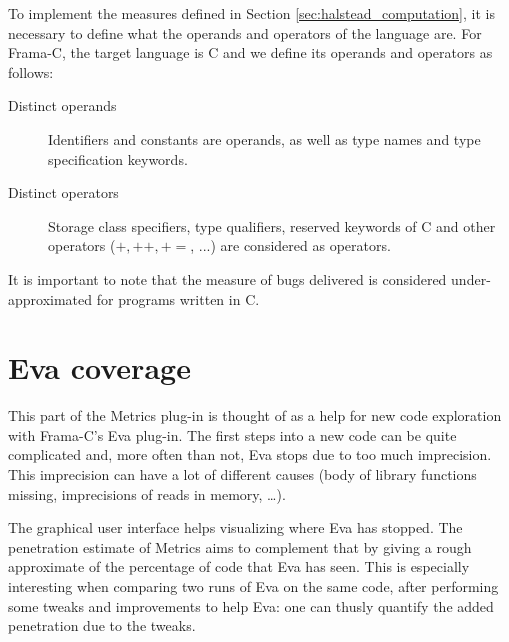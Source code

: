 \documentclass{frama-c-book}
\begin{document}
To implement the measures defined in Section \ref{sec:halstead_computation}, it
is necessary to define what the operands and operators of the language are. For
Frama-C, the target language is C and we define its operands and operators as
follows:
\begin{description}
\item[Distinct operands] Identifiers and constants are operands, as well as type
  names and type specification keywords.
\item[Distinct operators] Storage class specifiers, type qualifiers, reserved
  keywords of C and other operators ($+, ++, +=$, ...) are considered as operators.
\end{description}

It is important to note that the measure of bugs delivered is considered
under-approximated for programs written in C.

\section{Eva coverage}

This part of the Metrics plug-in is thought of as a help for new code
exploration with Frama-C's Eva plug-in. The first steps into a new
code can
be quite complicated and, more often than not, Eva stops due to too
much imprecision. This imprecision can have a lot of different causes (body of
library functions missing, imprecisions of reads in memory, \ldots).

The graphical user interface helps visualizing where Eva has
stopped. The penetration estimate of Metrics aims to complement that by giving a
rough approximate of the percentage of code that Eva has
seen. This is especially interesting when comparing two runs of Eva
on the same code, after performing some tweaks and improvements to help
Eva: one can thusly quantify the added penetration due
to the tweaks.





\end{document}

